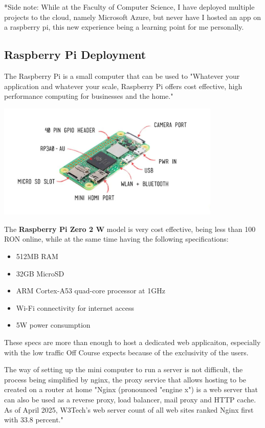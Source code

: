 \documentclass[12pt,a4paper]{report}
\begin{document}
*Side note: While at the Faculty of Computer Science, I have deployed multiple projects to the cloud, namely Microsoft Azure, but never have I hosted an app on a raspberry pi, this new experience being a learning point for me personally.

\subsection{Raspberry Pi Deployment}
The Raspberry Pi is a small computer that can be used to 
"Whatever your application and whatever your scale, Raspberry Pi offers cost effective, high performance computing for businesses and the home."~\cite{raspberryPi}

\begin{center}
\includegraphics[width=0.8\textwidth]{images/raspberrypi.png}
\end{center}

The \textbf{Raspberry Pi Zero 2 W} model is very cost effective, being less than 100 RON online, while at the same time having the following specifications:

\begin{itemize}
    \item 512MB RAM
    \item 32GB MicroSD
    \item ARM Cortex-A53 quad-core processor at 1GHz
    \item Wi-Fi connectivity for internet access
    \item 5W power consumption
\end{itemize}

These specs are more than enough to host a dedicated web applicaiton, especially with the low traffic Off Course expects because of the exclusivity of the users.

The way of setting up the mini computer to run a server is not difficult, the process being simplified by nginx, the proxy service that allows hosting to be created on a router at home "Nginx (pronounced "engine x") is a web server that can also be used as a reverse proxy, load balancer, mail proxy and HTTP cache. As of April 2025, W3Tech's web server count of all web sites ranked Nginx first with 33.8 percent."~\cite{nginX}
\end{document}

